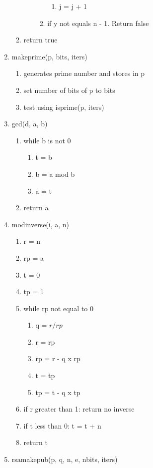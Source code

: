 \documentclass[11pt]{article}
\begin{document}
\begin{enumerate}
\begin{enumerate}
\begin{enumerate}
\begin{enumerate}
\begin{enumerate}
				\item j = j + 1
				\end{enumerate}
			\item if y not equals n - 1. Return false
			\end{enumerate}
		\end{enumerate}
	\item return true
	\end{enumerate}
\item makeprime(p, bits, iters)
	\begin{enumerate}
	\item generates prime number and stores in p
	\item set number of bits of p to bits
	\item test using isprime(p, iters)
	\end{enumerate}
\item gcd(d, a, b)
	\begin{enumerate}
	\item while b is not 0
		\begin{enumerate}
		\item t = b
		\item b = a mod b
		\item a = t
		\end{enumerate}
	\item return a
	\end{enumerate}
\item modinverse(i, a, n)
	\begin{enumerate}
	\item r = n
	\item rp = a
	\item t = 0
	\item tp = 1
	\item while rp not equal to 0
		\begin{enumerate}
		\item q = \(r/rp\)
		\item r = rp
		\item rp = r - q x rp
		\item t = tp
		\item tp = t - q x tp
		\end{enumerate}
	\item if r greater than 1: return no inverse
	\item if t less than 0: t = t + n
	\item return t
	\end{enumerate}
\item rsamakepub(p, q, n, e, nbits, iters)

\end{enumerate}
\end{document}
